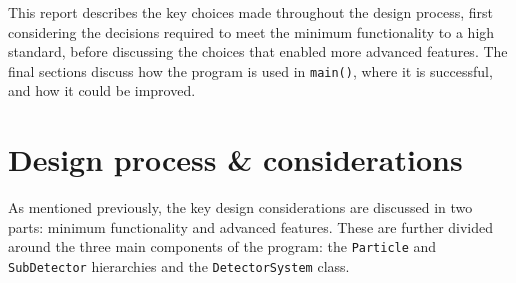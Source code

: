 \documentclass{article}
\begin{document}
This report describes the key choices made throughout the design process, first considering the decisions required to meet the minimum functionality to a high standard, before discussing the choices that enabled more advanced features.
The final sections discuss how the program is used in \texttt{main()}, where it is successful, and how it could be improved.

\section{Design process \& considerations}

As mentioned previously, the key design considerations are discussed in two parts: minimum functionality and advanced features. These are further divided around the three main components of the program: the \texttt{Particle} and \texttt{SubDetector} hierarchies and the \texttt{DetectorSystem} class.
\end{document}
